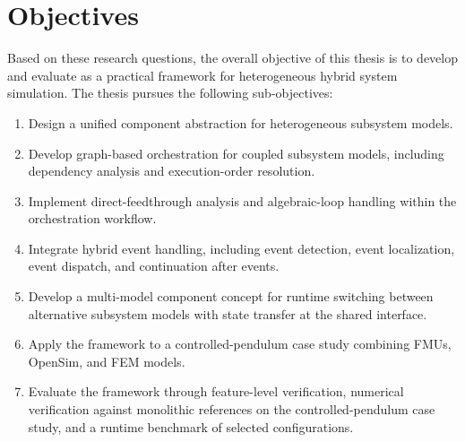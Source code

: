 \section{Objectives}
\label{sec:intro_objectives}

Based on these research questions, the overall objective of this thesis is to develop and evaluate \syssimx{} as a practical framework for heterogeneous hybrid system simulation.
The thesis pursues the following sub-objectives:

\begin{enumerate}
    \item[\textbf{O1}] Design a unified component abstraction for heterogeneous subsystem models.

    \item[\textbf{O2}] Develop graph-based orchestration for coupled subsystem models, including dependency analysis and execution-order resolution.

    \item[\textbf{O3}] Implement direct-feedthrough analysis and algebraic-loop handling within the orchestration workflow.

    \item[\textbf{O4}] Integrate hybrid event handling, including event detection, event localization, event dispatch, and continuation after events.

    \item[\textbf{O5}] Develop a multi-model component concept for runtime switching between alternative subsystem models with state transfer at the shared interface.

    \item[\textbf{O6}] Apply the framework to a controlled-pendulum case study combining \acp{FMU}, OpenSim, and \ac{FEM} models.

    \item[\textbf{O7}] Evaluate the framework through feature-level verification, numerical verification against monolithic references on the controlled-pendulum case study, and a runtime benchmark of selected configurations.

\end{enumerate}
